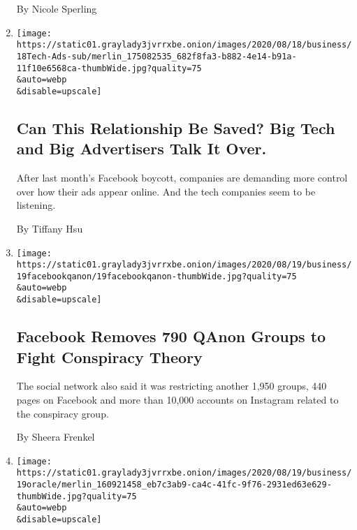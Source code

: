 \begin{enumerate}
  By Nicole Sperling
\item
  \href{/2020/08/19/business/media/advertising-tech-amazon-apple-facebook-google.html}{}

  \texttt{[image: https://static01.graylady3jvrrxbe.onion/images/2020/08/18/business/18Tech-Ads-sub/merlin\_175082535\_682f8fa3-b882-4e14-b91a-11f10e6568ca-thumbWide.jpg?quality=75\\\&auto=webp\\\&disable=upscale]}

  \hypertarget{can-this-relationship-be-saved-big-tech-and-big-advertisers-talk-it-over}{%
  \subsection{Can This Relationship Be Saved? Big Tech and Big
  Advertisers Talk It
  Over.}\label{can-this-relationship-be-saved-big-tech-and-big-advertisers-talk-it-over}}

  After last month's Facebook boycott, companies are demanding more
  control over how their ads appear online. And the tech companies seem
  to be listening.

  By Tiffany Hsu
\item
  \href{/2020/08/19/technology/facebook-qanon-groups-takedown.html}{}

  \texttt{[image: https://static01.graylady3jvrrxbe.onion/images/2020/08/19/business/19facebookqanon/19facebookqanon-thumbWide.jpg?quality=75\\\&auto=webp\\\&disable=upscale]}

  \hypertarget{facebook-removes-790-qanon-groups-to-fight-conspiracy-theory}{%
  \subsection{Facebook Removes 790 QAnon Groups to Fight Conspiracy
  Theory}\label{facebook-removes-790-qanon-groups-to-fight-conspiracy-theory}}

  The social network also said it was restricting another 1,950 groups,
  440 pages on Facebook and more than 10,000 accounts on Instagram
  related to the conspiracy group.

  By Sheera Frenkel
\item
  \href{/2020/08/19/technology/trump-oracle-tiktok.html}{}

  \texttt{[image: https://static01.graylady3jvrrxbe.onion/images/2020/08/19/business/19oracle/merlin\_160921458\_eb7c3ab9-ca4c-41fc-9f76-2931ed63e629-thumbWide.jpg?quality=75\\\&auto=webp\\\&disable=upscale]}

  \hypertarget{trump-says-oracle-could-handle-owning-tiktok}{%
}
\end{enumerate}
